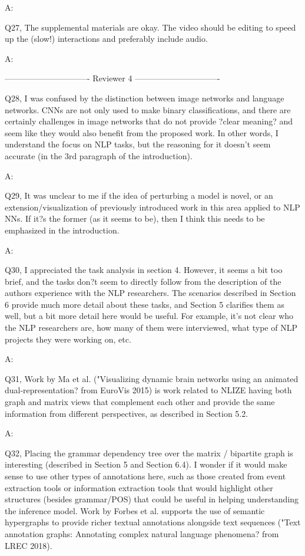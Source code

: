 A:

Q27, The supplemental materials are okay. The video should be editing to speed up the (slow!) interactions and preferably include audio.

A:


------------------------------- Reviewer 4 -------------------------------

Q28, I was confused by the distinction between image networks and language networks. CNNs are not only used to make binary classifications, and there are certainly challenges in image networks that do not provide ?clear meaning? and seem like they would also benefit from the proposed work. In other words, I understand the focus on NLP tasks, but the reasoning for it doesn't seem accurate (in the 3rd paragraph of the introduction).

A:

Q29, It was unclear to me if the idea of perturbing a model is novel, or an extension/visualization of previously introduced work in this area applied to NLP NNs. If it?s the former (as it seems to be), then I think this needs to be emphasized in the introduction.

A:

Q30, I appreciated the task analysis in section 4. However, it seems a bit too brief, and the tasks don?t seem to directly follow from the description of the authors experience with the NLP researchers. The scenarios described in Section 6 provide much more detail about these tasks, and Section 5 clarifies them as well, but a bit more detail here would be useful. For example, it's not clear who the NLP researchers are, how many of them were interviewed, what type of NLP projects they were working on, etc.

A:

Q31, Work by Ma et al. ("Visualizing dynamic brain networks using an animated dual-representation? from EuroVis 2015) is work related to NLIZE having both graph and matrix views that complement each other and provide the same information from different perspectives, as described in Section 5.2.

A:

Q32, Placing the grammar dependency tree over the matrix / bipartite graph is interesting (described in Section 5 and Section 6.4). I wonder if it would make sense to use other types of annotations here, such as those created from event extraction tools or information extraction tools that would highlight other structures (besides grammar/POS) that could be useful in helping understanding the inference model. Work by Forbes et al. supports the use of semantic hypergraphs to provide richer textual annotations alongside text sequences ("Text annotation graphs: Annotating complex natural language phenomena? from LREC 2018).

